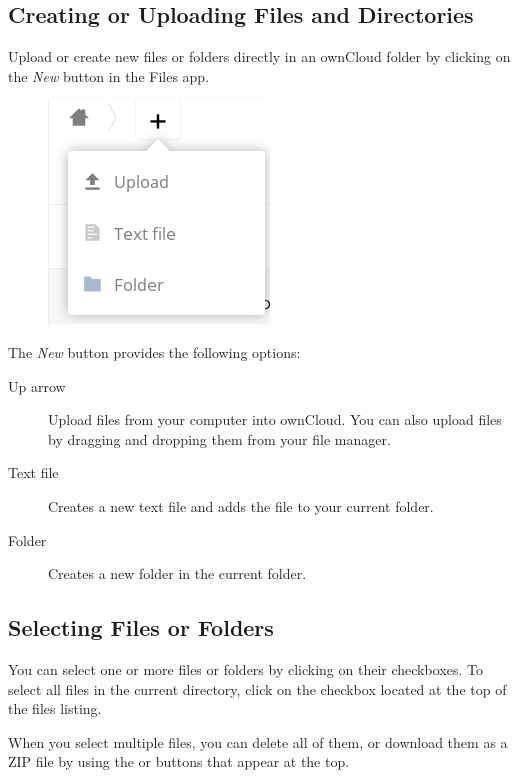 \documentclass[letterpaper,10pt,english]{sphinxmanual}
\begin{document}
\subsection{Creating or Uploading Files and Directories}
\label{files/access_webgui:creating-or-uploading-files-and-directories}
Upload or create new files or folders directly in an ownCloud folder by clicking
on the \emph{New} button in the Files app.
\begin{figure}[htbp]
\centering

\includegraphics{files_page-6.png}
\end{figure}

The \emph{New} button provides the following options:
\begin{description}
\item[{Up arrow}] \leavevmode
Upload files from your computer into ownCloud. You can also upload files by
dragging and dropping them from your file manager.

\item[{Text file}] \leavevmode
Creates a new text file and adds the file to your current folder.

\item[{Folder}] \leavevmode
Creates a new folder in the current folder.

\end{description}


\subsection{Selecting Files or Folders}
\label{files/access_webgui:selecting-files-or-folders}
You can select one or more files or folders by clicking on their checkboxes.  To
select all files in the current directory, click on the checkbox located at the
top of the files listing.

When you select multiple files, you can delete all of them, or download them as
a ZIP file by using the  or  buttons that appear at the
top.
\end{document}
